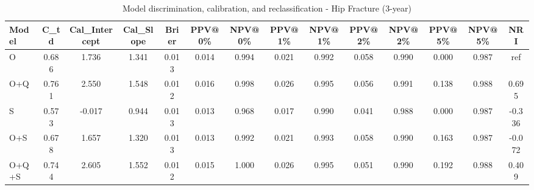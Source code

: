 \begin{table}[htbp]
\centering
\small
\caption{Model discrimination, calibration, and reclassification - Hip Fracture (3-year)}
\label{tab:perf_pd_3y}
\begin{tabular}{lccccccccccccc}
\toprule
Model & C\_td & Cal\_Intercept & Cal\_Slope & Brier & PPV@0\% & NPV@0\% & PPV@1\% & NPV@1\% & PPV@2\% & NPV@2\% & PPV@5\% & NPV@5\% & NRI \\
\midrule
O & 0.686 & 1.736 & 1.341 & 0.013 & 0.014 & 0.994 & 0.021 & 0.992 & 0.058 & 0.990 & 0.000 & 0.987 & ref \\
O+Q & 0.761 & 2.550 & 1.548 & 0.012 & 0.016 & 0.998 & 0.026 & 0.995 & 0.056 & 0.991 & 0.138 & 0.988 & 0.695 \\
S & 0.573 & -0.017 & 0.944 & 0.013 & 0.013 & 0.968 & 0.017 & 0.990 & 0.041 & 0.988 & 0.000 & 0.987 & -0.336 \\
O+S & 0.678 & 1.657 & 1.320 & 0.013 & 0.013 & 0.992 & 0.021 & 0.993 & 0.058 & 0.990 & 0.163 & 0.987 & -0.072 \\
O+Q+S & 0.744 & 2.605 & 1.552 & 0.012 & 0.015 & 1.000 & 0.026 & 0.995 & 0.051 & 0.990 & 0.192 & 0.988 & 0.409 \\
\bottomrule
\end{tabular}
\end{table}